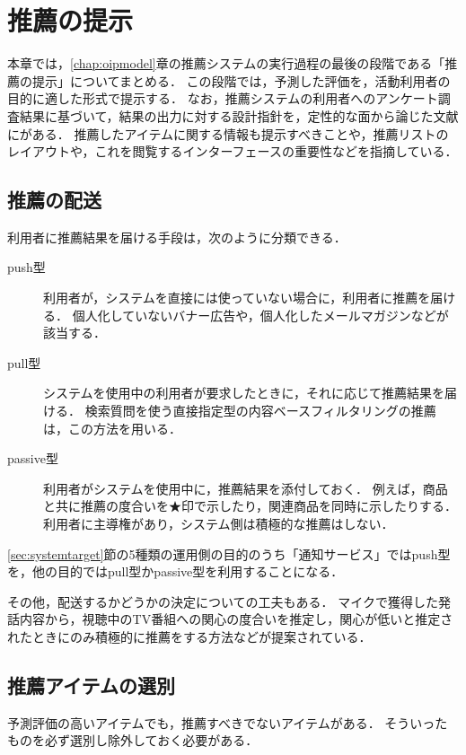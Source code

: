 \chapter{推薦の提示}
\label{chap:output}

本章では，\ref{chap:oipmodel}章の推薦システムの実行過程の最後の段階である「推薦の提示」についてまとめる．
この段階では，予測した評価を，活動利用者の目的に適した形式で提示する．
なお，推薦システムの利用者へのアンケート調査結果に基づいて，結果の出力に対する設計指針を，定性的な面から論じた文献に\cite{sigir:01:01}がある．
推薦したアイテムに関する情報も提示すべきことや，推薦リストのレイアウトや，これを閲覧するインターフェースの重要性などを指摘している．

\section{推薦の配送}
\label{sec:present:delivery}

利用者に推薦結果を届ける手段は，次のように分類できる．
\begin{description}
 \item[push型]
 利用者が，システムを直接には使っていない場合に，利用者に推薦を届ける．
 個人化していないバナー広告や，個人化したメールマガジンなどが該当する．
 \item[pull型]
 システムを使用中の利用者が要求したときに，それに応じて推薦結果を届ける．
 検索質問を使う直接指定型の内容ベースフィルタリングの推薦は，この方法を用いる．
 \item[passive型]
 利用者がシステムを使用中に，推薦結果を添付しておく．
 例えば，商品と共に推薦の度合いを★印で示したり，関連商品を同時に示したりする．
 利用者に主導権があり，システム側は積極的な推薦はしない．
\end{description}
\ref{sec:systemtarget}節の5種類の運用側の目的のうち「通知サービス」ではpush型を，他の目的ではpull型かpassive型を利用することになる．

その他，配送するかどうかの決定についての工夫もある．
マイクで獲得した発話内容から，視聴中のTV番組への関心の度合いを推定し，関心が低いと推定されたときにのみ積極的に推薦をする方法\cite{trjsai:07:01}などが提案されている．

\section{推薦アイテムの選別}
\label{sec:present:selection}

予測評価の高いアイテムでも，推薦すべきでないアイテムがある．
そういったものを必ず選別し除外しておく必要がある．

